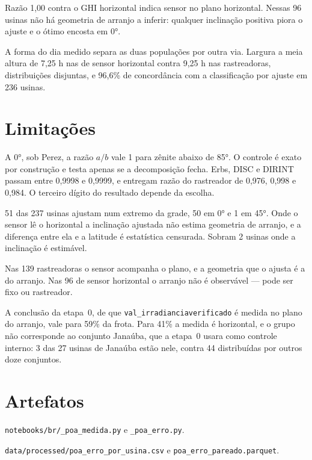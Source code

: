 \documentclass[10pt,a4paper,oneside,twocolumn]{book}
\begin{document}
\vspace{0.6em}
Razão 1,00 contra o GHI horizontal indica sensor no plano horizontal. Nessas 96
usinas não há geometria de arranjo a inferir: qualquer inclinação positiva piora
o ajuste e o ótimo encosta em 0°.

 A forma do dia medido separa as duas
populações por outra via. Largura a meia altura de 7,25 h nas de sensor
horizontal contra 9,25 h nas rastreadoras, distribuições disjuntas, e 96,6\% de
concordância com a classificação por ajuste em 236 usinas.

\section*{Limitações}

 A 0°, sob Perez, a razão $a/b$
vale 1 para zênite abaixo de 85°. O controle é exato por construção e testa
apenas se a decomposição fecha. Erbs, DISC e DIRINT passam entre 0,9998 e
0,9999, e entregam razão do rastreador de 0,976, 0,998 e 0,984. O terceiro
dígito do resultado depende da escolha.

 51 das 237 usinas ajustam num extremo da grade,
50 em 0° e 1 em 45°. Onde o sensor lê o horizontal a inclinação ajustada não
estima geometria de arranjo, e a diferença entre ela e a latitude é estatística
censurada. Sobram 2 usinas onde a inclinação é estimável.

 Nas 139 rastreadoras o
sensor acompanha o plano, e a geometria que o ajusta é a do arranjo. Nas 96 de
sensor horizontal o arranjo não é observável --- pode ser fixo ou rastreador.

\begin{objecao}
A conclusão da etapa~0, de que \texttt{val\_irradianciaverificado} é medida no
plano do arranjo, vale para 59\% da frota. Para 41\% a medida é horizontal, e o
grupo não corresponde ao conjunto Janaúba, que a etapa~0 usara como controle
interno: 3 das 27 usinas de Janaúba estão nele, contra 44 distribuídas por outros
doze conjuntos.
\end{objecao}

\section*{Artefatos}

\begin{ficha}
  \item[Código] \texttt{notebooks/br/\_poa\_medida.py} e
                \texttt{\_poa\_erro.py}.
  \item[Saídas] \texttt{data/processed/poa\_erro\_por\_usina.csv} e
                \texttt{poa\_erro\_pareado.parquet}.
\end{ficha}
\end{document}
